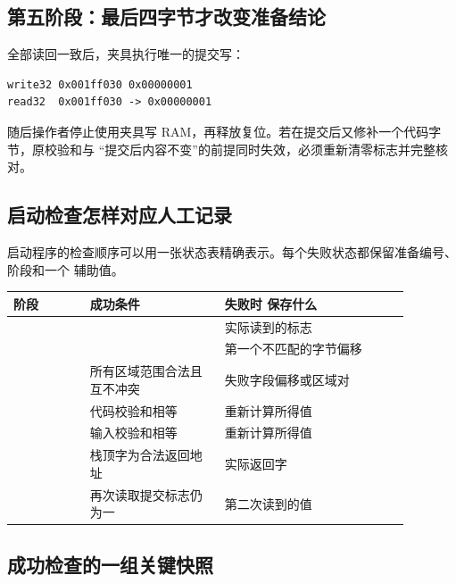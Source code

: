 \subsection{第五阶段：最后四字节才改变准备结论}

全部读回一致后，夹具执行唯一的提交写：

\begin{lstlisting}
write32 0x001ff030 0x00000001
read32  0x001ff030 -> 0x00000001
\end{lstlisting}

随后操作者停止使用夹具写 RAM，再释放复位。若在提交后又修补一个代码字节，原校验和与
“提交后内容不变”的前提同时失效，必须重新清零标志并完整核对。

\subsection{启动检查怎样对应人工记录}

启动程序的检查顺序可以用一张状态表精确表示。每个失败状态都保留准备编号、阶段和一个
辅助值。

\begin{longtable}{|L{0.17\linewidth}|L{0.30\linewidth}|L{0.41\linewidth}|}
\hline
{}
阶段 & 成功条件 & 失败时  保存什么 \\ \hline
{} &  & 实际读到的标志 \\ \hline
{} &  & 第一个不匹配的字节偏移 \\ \hline
{} & 所有区域范围合法且互不冲突 & 失败字段偏移或区域对 \\ \hline
{} & 代码校验和相等 & 重新计算所得值 \\ \hline
{} & 输入校验和相等 & 重新计算所得值 \\ \hline
{} & 栈顶字为合法返回地址 & 实际返回字 \\ \hline
{} & 再次读取提交标志仍为一 & 第二次读到的值 \\ \hline
\end{longtable}

\subsection{成功检查的一组关键快照}

